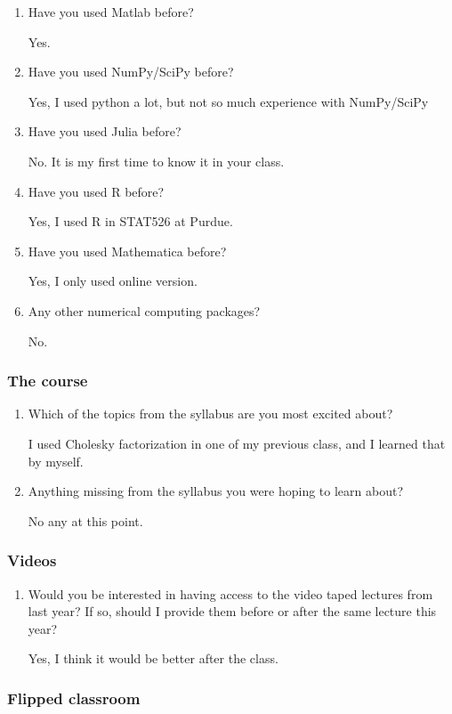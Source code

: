 \documentclass{article}
\begin{document}
\begin{enumerate}%
\item Have you used Matlab before?

Yes. 

\item Have you used NumPy/SciPy before?

Yes, I used python a lot, but not so much experience with NumPy/SciPy

\item Have you used Julia before?

No. It is my first time to know it in your class. 

\item Have you used R before?

Yes, I used R in STAT526 at Purdue. 

\item Have you used Mathematica before?

Yes, I only used online version. 

\item Any other numerical computing packages?

No. 


\end{enumerate}
\hypertarget{the_course_4}{}\subsubsection*{{The course}}\label{the_course_4}

\begin{enumerate}%
\item Which of the topics from the syllabus are you most excited about?

I used Cholesky factorization in one of my previous class, and I learned that by myself.  

\item Anything missing from the syllabus you were hoping to learn about?

No any at this point. 


\end{enumerate}
\hypertarget{videos_5}{}\subsubsection*{{Videos}}\label{videos_5}

\begin{enumerate}%
\item Would you be interested in having access to the video taped lectures from last year? If so, should I provide them before or after the same lecture this year?

Yes, I think it would be better after the class. 

\end{enumerate}
\hypertarget{flipped_classroom_6}{}\subsubsection*{{Flipped classroom}}\label{flipped_classroom_6}
\end{document}
